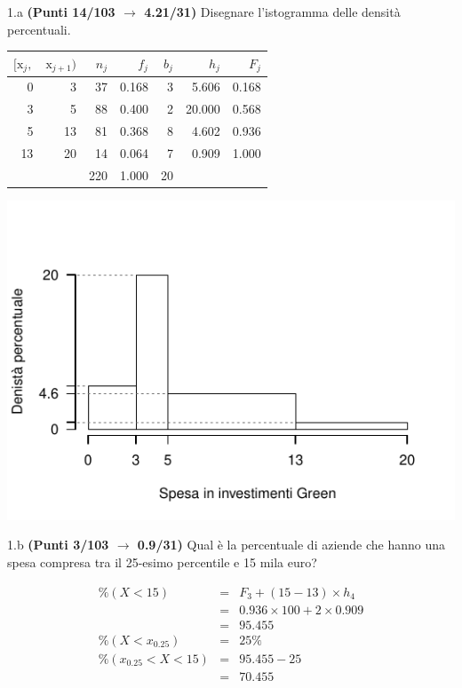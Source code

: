 \documentclass[
  11pt,
]{book}
\theoremstyle{mytheoremstyle}
\theoremstyle{mydefstyle}
\newenvironment{sol}
  {
  \begin{tcolorbox}[enhanced,breakable,arc=0.1mm,boxrule=1pt,colback=white,colframe=iblue,
  title=\bf \fontfamily{lmss}\selectfont \hspace{.5 cm} Soluzione,drop fuzzy shadow]

}{
\end{tcolorbox}
  }
\begin{document}
1.a \textbf{(Punti 14/103 \(\rightarrow\) 4.21/31)} Disegnare l'istogramma delle densità percentuali.

\begin{sol}

\begin{table}[H]
\centering
\begin{tabular}{rrrrrrr}
\toprule
$[\text{x}_j,$ & $\text{x}_{j+1})$ & $n_j$ & $f_j$ & $b_j$ & $h_j$ & $F_j$\\
\midrule
0 & 3 & 37 & 0.168 & 3 & 5.606 & 0.168\\
3 & 5 & 88 & 0.400 & 2 & 20.000 & 0.568\\
5 & 13 & 81 & 0.368 & 8 & 4.602 & 0.936\\
13 & 20 & 14 & 0.064 & 7 & 0.909 & 1.000\\
 &  & 220 & 1.000 & 20 &  & \\
\bottomrule
\end{tabular}
\end{table}

\begin{center}\includegraphics{Esami_passati_con_soluzioni_files/figure-latex/2022-68-1} \end{center}

\end{sol}

1.b \textbf{(Punti 3/103 \(\rightarrow\) 0.9/31)} Qual è la percentuale di aziende che hanno una spesa
compresa tra il 25-esimo percentile e 15 mila euro?

\begin{sol}
\begin{eqnarray*}
  \%(X<15) &=&  F_3+(15-13)\times h_4\\
  &=& 0.936\times 100+2\times 0.909\\
  &=& 95.455\\
  \%(X<x_{0.25}) &=&  25\%\\
  \%(x_{0.25}<X<15)&=& 95.455-25\\
  &=& 70.455
\end{eqnarray*}

\end{sol}
\end{document}
